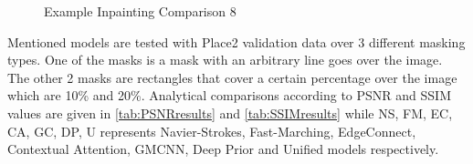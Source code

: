 \begin{figure}[!ht]
        \hspace{0.02\columnwidth}
        \hspace{0.02\columnwidth}
        \vspace*{3mm}
        \caption{Example Inpainting Comparison 8}
    \label{fig:test1}
\end{figure}
\newpage


Mentioned models are tested with Place2 validation data over 3 different masking types. One of the masks is a mask with an arbitrary line goes over the image. The other 2 masks are rectangles that cover a certain percentage over the image which are 10\% and 20\%. Analytical comparisons according to PSNR and SSIM values are given in \ref{tab:PSNRresults} and \ref{tab:SSIMresults} while NS, FM, EC, CA, GC, DP, U represents Navier-Strokes, Fast-Marching, EdgeConnect, Contextual Attention, GMCNN, Deep Prior and Unified models respectively.


